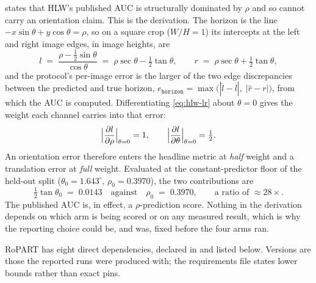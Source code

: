 \documentclass[final_report.tex]{subfiles}
\begin{document}
\label{apx:auc-weighting}
 states that HLW's published AUC is structurally dominated by $\rho$ and
so cannot carry an orientation claim. This is the derivation. The horizon is the line $-x\sin\theta + y\cos\theta = \rho$, so on a square
crop ($W/H = 1$) its intercepts at the left and right image edges, in image heights, are
\begin{equation}\label{eq:hlw-lr}
  l \;=\; \frac{\rho - \tfrac{1}{2}\sin\theta}{\cos\theta}
    \;=\; \rho\sec\theta - \tfrac{1}{2}\tan\theta,
  \qquad
  r \;=\; \rho\sec\theta + \tfrac{1}{2}\tan\theta ,
\end{equation}
and the protocol's per-image error is the larger of the two edge discrepancies between the
predicted and true horizon, $e_{\texttt{horizon}} = \max\bigl(|\hat l - l|,\; |\hat r - r|\bigr)$,
from which the AUC is computed. Differentiating \cref{eq:hlw-lr} about $\theta = 0$ gives the
weight each channel carries into that error:
\begin{equation}\label{eq:hlw-weights}
  \Bigl|\frac{\partial l}{\partial \rho}\Bigr|_{\theta = 0} = 1,
  \qquad
  \Bigl|\frac{\partial l}{\partial \theta}\Bigr|_{\theta = 0} = \tfrac{1}{2} .
\end{equation}
An orientation error therefore enters the headline metric at \emph{half} weight and a
translation error at \emph{full} weight. Evaluated at the constant-predictor floor of the
held-out split ($\theta_0 = 1.643^\circ$, $\rho_0 = 0.3970$), the two contributions are
\begin{equation}\label{eq:hlw-dominance}
  \tfrac{1}{2}\tan\theta_0 \;=\; 0.0143
  \quad\text{against}\quad
  \rho_0 \;=\; 0.3970 ,
  \qquad
  \text{a ratio of } \approx 28\times .
\end{equation}
The published AUC is, in effect, a $\rho$-prediction score. Nothing in the derivation depends
on which arm is being scored or on any measured result, which is why the reporting choice
could be, and was, fixed before the four arms ran.


\label{apx:software-stack}
RoPART has eight direct dependencies, declared in  and listed
below. Versions are those the reported runs were produced with; the requirements file states
lower bounds rather than exact pins.
\end{document}
